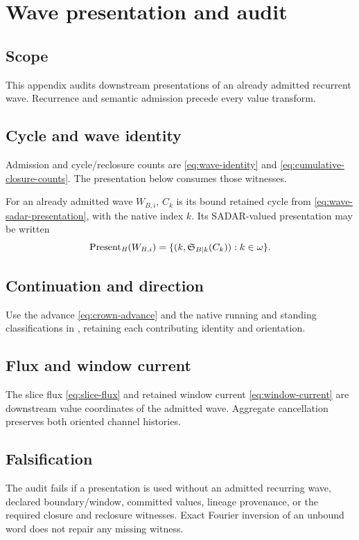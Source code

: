 \section{Wave presentation and audit}
\label{app:wave}

\subsection{Scope}
\label{app:wave:scope}
This appendix audits downstream presentations of an already admitted recurrent
wave. Recurrence and semantic admission precede every value transform.

\subsection{Cycle and wave identity}
\label{app:wave:cycle-wave-identity}
Admission and cycle/reclosure counts are \eqref{eq:wave-identity} and
\eqref{eq:cumulative-closure-counts}. The presentation below consumes those
witnesses.

For an already admitted wave \(W_{B,i}\), \(C_k\) is its bound retained cycle
from \eqref{eq:wave-sadar-presentation}, with the native index \(k\).
Its SADAR-valued presentation may be written
\begin{equation}
\operatorname{Present}_{B}(W_{B,i})
=
\{(k,\mathfrak S_{B|k}(C_k)):k\in\omega\}.
\label{app:wave:eq:wave-sadar-presentation}
\end{equation}

\subsection{Continuation and direction}
\label{app:wave:fractal-growth-temporal-direction}
Use the advance \eqref{eq:crown-advance} and the native running and standing
classifications in , retaining each contributing identity and orientation.

\subsection{Flux and window current}
\label{app:wave:flux-current}
The slice flux \eqref{eq:slice-flux} and retained window current
\eqref{eq:window-current} are downstream value coordinates of the admitted
wave. Aggregate cancellation preserves both oriented channel histories.

\subsection{Falsification}
\label{app:wave:falsification}
The audit fails if a presentation is used without an admitted recurring wave,
declared boundary/window, committed values, lineage provenance, or the required
closure and reclosure witnesses. Exact Fourier inversion of an unbound word
does not repair any missing witness.

